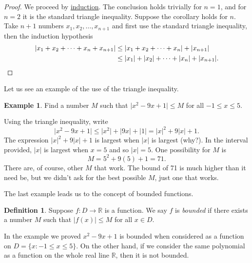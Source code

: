 \documentclass[12pt]{book}
\newcommand{\sabs}[1]{\lvert {#1} \rvert}
\newcommand{\abs}[1]{\left\lvert {#1} \right\rvert}
\newcommand{\R}{{\mathbb{R}}}
\theoremstyle{plain}
\theoremstyle{remark}
\theoremstyle{definition}
\newtheorem{defn}[thm]{Definition}
\theoremstyle{exercise}
\theoremstyle{example}
\newtheorem{example}[thm]{Example}
\begin{document}
\begin{proof}
We proceed by \hyperref[induction:thm]{induction}.
The conclusion holds trivially for $n=1$, and
for $n=2$ it is the standard triangle inequality.  Suppose the corollary
holds for $n$.  Take $n+1$ numbers $x_1,x_2,\ldots,x_{n+1}$ and 
first use the standard triangle inequality, then the induction
hypothesis
\begin{equation*}
\begin{split}
\sabs{x_1 + x_2 + \cdots + x_n + x_{n+1}} & \leq 
\sabs{x_1 + x_2 + \cdots + x_n} + \sabs{x_{n+1}} \\
& \leq 
\sabs{x_1} + \sabs{x_2} + \cdots + \sabs{x_n} + \sabs{x_{n+1}} .  \qedhere
\end{split}
\end{equation*}
\end{proof}

Let us see an example of the use of the triangle inequality.

\begin{example}
Find a number $M$ such that $\sabs{x^2-9x+1} \leq M$ for all $-1 \leq x \leq
5$.

Using the triangle inequality, write
\begin{equation*}
\sabs{x^2-9x+1} \leq \sabs{x^2}+\sabs{9x}+\sabs{1}
=
\sabs{x}^2+9\sabs{x}+1 .
\end{equation*}
The expression
$\sabs{x}^2+9\sabs{x}+1$ is largest when $\abs{x}$ is largest (why?).  In the interval
provided, $\abs{x}$ is largest when $x=5$ and so $\abs{x}=5$.  One
possibility for $M$ is
\begin{equation*}
M = 5^2+9(5)+1 = 71 .
\end{equation*}
There are, of course, other $M$ that work.  The bound of 71
is much higher than it
need be, but we didn't ask for the best possible $M$, just one that works.
\end{example}

The last example leads us to the concept of bounded functions.

\begin{defn}
Suppose $f \colon D \to \R$ is a function.  We say $f$ is
\emph{bounded}
if there exists a number $M$
such that $\abs{f(x)} \leq M$ for all $x \in D$.
\end{defn}

In the example we proved $x^2-9x+1$ is bounded when considered as a
function on $D = \{ x : -1 \leq x \leq 5 \}$.   On the other hand,
if we consider the same polynomial as a function on the whole real line $\R$,
then it is not bounded.
\end{document}
